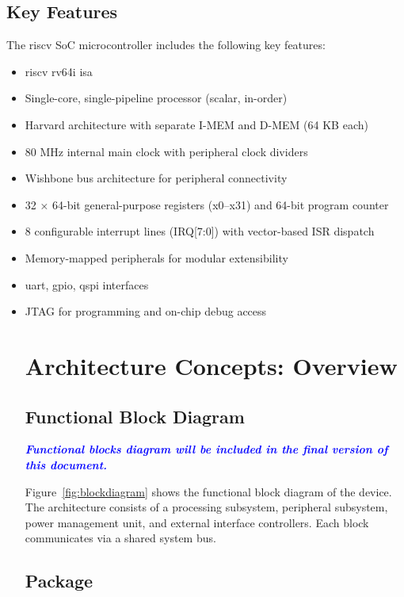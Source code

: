 \subsection{Key Features} 
The \gls{riscv} \gls{SoC} microcontroller includes the following key features:
\begin{itemize}

    \item \gls{riscv} \gls{rv64i} \gls{isa}
    \item Single-core, single-\gls{pipeline} processor (scalar, in-order)
    \item \gls{Harvard} architecture with separate \gls{I-MEM} and \gls{D-MEM} (64 KB each)
    \item 80 MHz internal main clock with peripheral clock dividers
    \item Wishbone bus architecture for peripheral connectivity
    \item 32 × 64-bit general-purpose registers (x0–x31) and 64-bit program counter
    \item 8 configurable interrupt lines (\gls{IRQ}[7:0]) with vector-based ISR dispatch
    \item Memory-mapped peripherals for modular extensibility
    \item \gls{uart}, \gls{gpio}, \gls{qspi} interfaces
    \item JTAG for programming and on-chip debug access

\section{Architecture Concepts: Overview}

\subsection{Functional Block Diagram} 

\textcolor{blue}{\textbf{\textit{Functional blocks diagram will be included in the final version of this document.}}}

Figure~\ref{fig:blockdiagram} shows the functional block diagram of the device. The architecture 
consists of a processing subsystem, peripheral subsystem, power management unit, and external 
interface controllers. Each block communicates via a shared system bus.

\subsection{Package}


\end{itemize}
